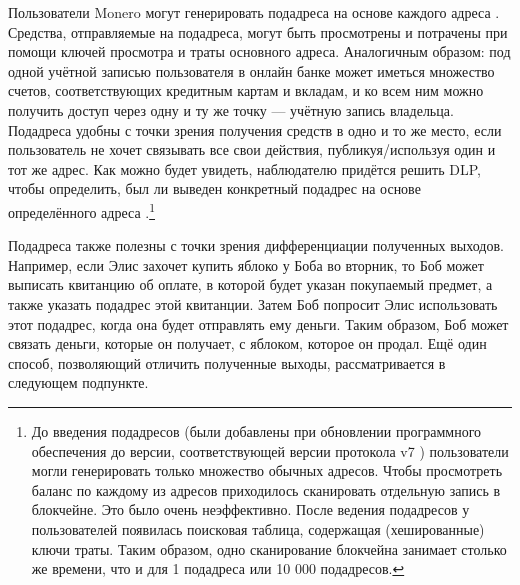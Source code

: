 Пользователи Monero могут генерировать подадреса на основе каждого адреса \cite{MRL-0006-subaddresses}. Средства, отправляемые на подадреса, могут быть просмотрены и потрачены при помощи ключей просмотра и траты основного адреса. Аналогичным образом: под одной учётной записью пользователя в онлайн банке может иметься множество счетов, соответствующих кредитным картам и вкладам, и ко всем ним можно получить доступ через одну и ту же точку — учётную запись владельца.\\

Подадреса удобны с точки зрения получения средств в одно и то же место, если пользователь не хочет связывать все свои действия, публикуя/используя один и тот же адрес. Как можно будет увидеть, наблюдателю придётся решить DLP, чтобы определить, был ли выведен кон\-кретный подадрес на основе определённого адреса \cite{MRL-0006-subaddresses}.\footnote{До введения подадресов (были добавлены при обновлении программного обеспечения до версии, соответствующей версии протокола v7 \cite{subaddress-pull-request}) пользователи могли генерировать только множество обычных адресов. Чтобы просмотреть баланс по каждому из адресов приходилось сканировать отдельную запись в блокчейне. Это было очень неэффективно. После ведения подадресов у пользователей появилась поисковая таблица, содержащая (хешированные) ключи траты. Таким образом, одно сканирование блокчейна занимает столько же времени, что и для 1 подадреса или 10 000 подадресов.}

Подадреса также полезны с точки зрения дифференциации полученных выходов. Например, если Элис захочет купить яблоко у Боба во вторник, то Боб может выписать квитанцию об оплате, в которой будет указан покупаемый предмет, а также указать подадрес этой квитанции. Затем Боб попросит Элис использовать этот подадрес, когда она будет отправлять ему деньги. Таким образом, Боб может связать деньги, которые он получает, с яблоком, которое он продал. Ещё один способ, позволяющий отличить полученные выходы, рассматри\-вается в следующем подпункте.%

